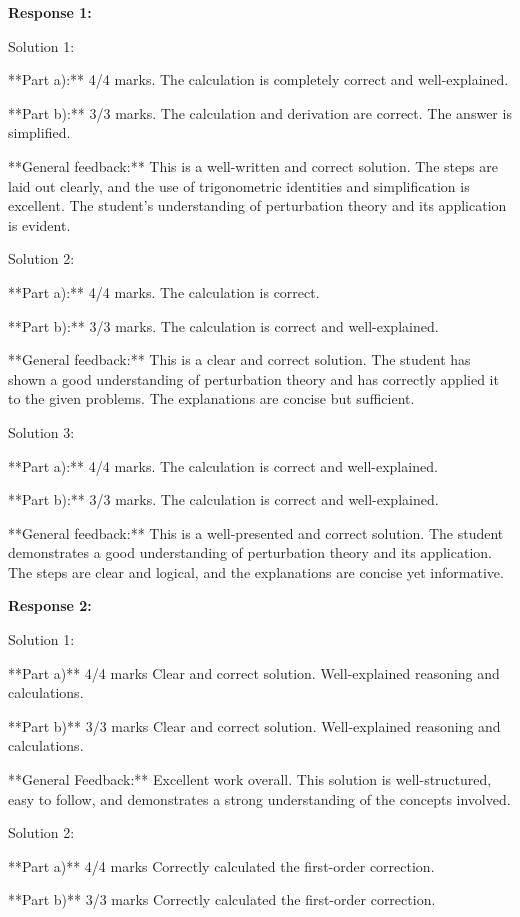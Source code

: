\documentclass[a4paper,11pt]{article}
\begin{document}
\textbf{Response 1:}

Solution 1:

**Part a):** 4/4 marks. The calculation is completely correct and well-explained.

**Part b):** 3/3 marks. The calculation and derivation are correct. The answer is simplified.

**General feedback:** This is a well-written and correct solution. The steps are laid out clearly, and the use of trigonometric identities and simplification is excellent. The student's understanding of perturbation theory and its application is evident.

Solution 2:

**Part a):** 4/4 marks. The calculation is correct.

**Part b):** 3/3 marks. The calculation is correct and well-explained.

**General feedback:** This is a clear and correct solution. The student has shown a good understanding of perturbation theory and has correctly applied it to the given problems. The explanations are concise but sufficient.

Solution 3:

**Part a):** 4/4 marks. The calculation is correct and well-explained.

**Part b):** 3/3 marks. The calculation is correct and well-explained.

**General feedback:** This is a well-presented and correct solution. The student demonstrates a good understanding of perturbation theory and its application. The steps are clear and logical, and the explanations are concise yet informative.

\bigskip    
\textbf{Response 2:}

Solution 1:

**Part a)** 4/4 marks
Clear and correct solution. Well-explained reasoning and calculations.

**Part b)** 3/3 marks
Clear and correct solution. Well-explained reasoning and calculations.

**General Feedback:** Excellent work overall. This solution is well-structured, easy to follow, and demonstrates a strong understanding of the concepts involved.

Solution 2:

**Part a)** 4/4 marks
Correctly calculated the first-order correction.

**Part b)** 3/3 marks
Correctly calculated the first-order correction.
\end{document}
